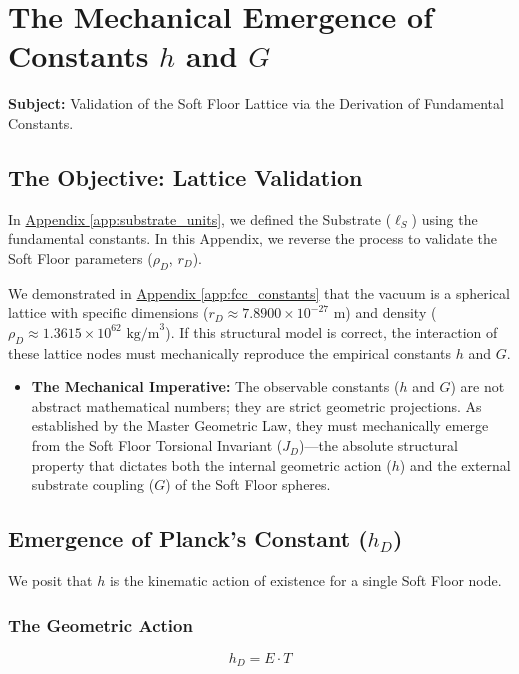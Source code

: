 \chapter{The Mechanical Emergence of Constants $h$ and $G$}
\label{app:emergence_h_G}

\textbf{Subject:} Validation of the Soft Floor Lattice via the Derivation of Fundamental Constants.

\section{The Objective: Lattice Validation}
In \hyperref[app:substrate_units]{Appendix \ref*{app:substrate_units}}, we defined the Substrate ($\ell_S$) using the fundamental constants. In this Appendix, we reverse the process to validate the Soft Floor parameters ($\rho_D$, $r_D$).

We demonstrated in \hyperref[app:fcc_constants]{Appendix \ref*{app:fcc_constants}} that the vacuum is a spherical lattice with specific dimensions ($r_D \approx 7.8900 \times 10^{-27} \text{ m}$) and density ($\rho_D \approx 1.3615 \times 10^{62} \text{ kg/m}^3$). If this structural model is correct, the interaction of these lattice nodes must mechanically reproduce the empirical constants $h$ and $G$.

\begin{itemize}
    \item \textbf{The Mechanical Imperative:} The observable constants ($h$ and $G$) are not abstract mathematical numbers; they are strict geometric projections. As established by the Master Geometric Law, they must mechanically emerge from the Soft Floor Torsional Invariant ($J_D$)---the absolute structural property that dictates both the internal geometric action ($h$) and the external substrate coupling ($G$) of the Soft Floor spheres.
\end{itemize}

\section{Emergence of Planck's Constant ($h_D$)}
We posit that $h$ is the kinematic action of existence for a single Soft Floor node.

\subsection{The Geometric Action}
\begin{equation}
    h_D = E \cdot T
\end{equation}

